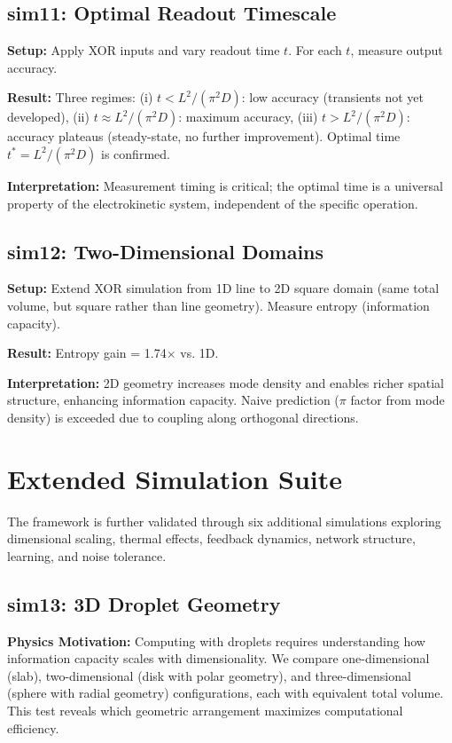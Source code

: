 \documentclass[11pt]{article}
\begin{document}
\subsection{sim11: Optimal Readout Timescale}

\textbf{Setup:} Apply XOR inputs and vary readout time $t$. For each $t$, measure output accuracy.

\textbf{Result:} Three regimes: (i) $t < L^2/(\pi^2 D)$: low accuracy (transients not yet developed), (ii) $t \approx L^2/(\pi^2 D)$: maximum accuracy, (iii) $t > L^2/(\pi^2 D)$: accuracy plateaus (steady-state, no further improvement). Optimal time $t^* = L^2/(\pi^2 D)$ is confirmed.

\textbf{Interpretation:} Measurement timing is critical; the optimal time is a universal property of the electrokinetic system, independent of the specific operation.

\subsection{sim12: Two-Dimensional Domains}

\textbf{Setup:} Extend XOR simulation from 1D line to 2D square domain (same total volume, but square rather than line geometry). Measure entropy (information capacity).

\textbf{Result:} Entropy gain = 1.74$\times$ vs. 1D.

\textbf{Interpretation:} 2D geometry increases mode density and enables richer spatial structure, enhancing information capacity. Naive prediction ($\pi$ factor from mode density) is exceeded due to coupling along orthogonal directions.

\section{Extended Simulation Suite}

The framework is further validated through six additional simulations exploring dimensional scaling, thermal effects, feedback dynamics, network structure, learning, and noise tolerance.

\subsection{sim13: 3D Droplet Geometry}

\textbf{Physics Motivation:} Computing with droplets requires understanding how information capacity scales with dimensionality. We compare one-dimensional (slab), two-dimensional (disk with polar geometry), and three-dimensional (sphere with radial geometry) configurations, each with equivalent total volume. This test reveals which geometric arrangement maximizes computational efficiency.
\end{document}
